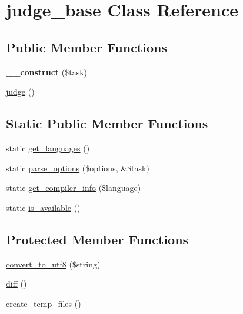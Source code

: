\hypertarget{classjudge__base}{\section{judge\-\_\-base Class Reference}
\label{classjudge__base}
}
\subsection*{Public Member Functions}
\begin{DoxyCompactItemize}
\item 
\hypertarget{classjudge__base_a657dfe7c7b40926f36b41d2694dcb3a2}{{\bfseries \-\_\-\-\_\-construct} (\$task)}\label{classjudge__base_a657dfe7c7b40926f36b41d2694dcb3a2}

\item 
\hyperlink{classjudge__base_a5de54be3bb7d6eaf4f99db87ab9074d0}{judge} ()
\end{DoxyCompactItemize}
\subsection*{Static Public Member Functions}
\begin{DoxyCompactItemize}
\item 
static \hyperlink{classjudge__base_a3ec6284e7ab117f88e9ac8590f5a7984}{get\-\_\-languages} ()
\item 
static \hyperlink{classjudge__base_abcb84ebdef8bd20fbd517c37ea09d162}{parse\-\_\-options} (\$options, \&\$task)
\item 
static \hyperlink{classjudge__base_a67f8533487464f6b877981585a8c6bc4}{get\-\_\-compiler\-\_\-info} (\$language)
\item 
static \hyperlink{classjudge__base_a61fce49424ae08c6d3edccf6f8cc768f}{is\-\_\-available} ()
\end{DoxyCompactItemize}
\subsection*{Protected Member Functions}
\begin{DoxyCompactItemize}
\item 
\hyperlink{classjudge__base_abf16f4357be502834cd1415067479581}{convert\-\_\-to\-\_\-utf8} (\$string)
\item 
\hyperlink{classjudge__base_a01360820e47c36821fca6c45e5f259e3}{diff} ()
\item 
\hyperlink{classjudge__base_a72ad9e732c1f6317999bc6ab89f8b5a0}{create\-\_\-temp\-\_\-files} ()
\end{DoxyCompactItemize}
